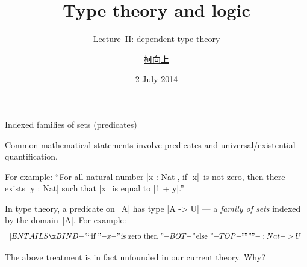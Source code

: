 \documentclass[t,compress,hyperref={hidelinks}]{beamer}
\newcommand{\lectureno}{II}
\begin{document}

\title{Type theory and logic}
\subtitle{Lecture~\lectureno: dependent type theory}
\date{2 July 2014}
\author{{\href{http://www.cs.ox.ac.uk/people/hsiang-shang.ko/}{柯向上}}}

{
\begin{frame}
\titlepage
\end{frame}}

\begin{frame}{Indexed families of sets (predicates)}

Common mathematical statements involve predicates and universal/existential quantification.

For example: ``For all natural number |x : Nat|, if |x|~is not zero, then there exists |y : Nat| such that |x|~is equal to |1 + y|.''

In type theory, a predicate on~|A| has type |A -> U| --- a \emph{family of sets} indexed by the domain~|A|.
For example:
\[ |ENTAILS \x BIND {-"\text{``if }"-} x {-"\text{\kern1pt is zero then }"-} BOT {-"\text{\kern1pt else }"-} TOP {-"\text{\kern-.1em''''}"-} : Nat -> U| \]

 The above treatment is in fact unfounded in our current theory. Why?

\end{frame}
\end{document}
